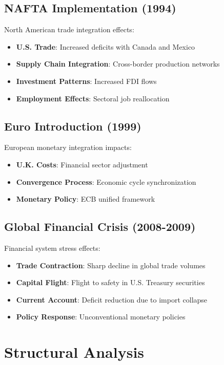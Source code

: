 \documentclass[11pt,a4paper]{article}
\begin{document}
\subsection{NAFTA Implementation (1994)}
North American trade integration effects:

\begin{itemize}
    \item \textbf{U.S. Trade}: Increased deficits with Canada and Mexico
    \item \textbf{Supply Chain Integration}: Cross-border production networks
    \item \textbf{Investment Patterns}: Increased FDI flows
    \item \textbf{Employment Effects}: Sectoral job reallocation
\end{itemize}

\subsection{Euro Introduction (1999)}
European monetary integration impacts:

\begin{itemize}
    \textbf{German Benefits}: Export competitiveness gains
    \item \textbf{U.K. Costs}: Financial sector adjustment
    \item \textbf{Convergence Process}: Economic cycle synchronization
    \item \textbf{Monetary Policy}: ECB unified framework
\end{itemize}

\subsection{Global Financial Crisis (2008-2009)}
Financial system stress effects:

\begin{itemize}
    \item \textbf{Trade Contraction}: Sharp decline in global trade volumes
    \item \textbf{Capital Flight}: Flight to safety in U.S. Treasury securities
    \item \textbf{Current Account}: Deficit reduction due to import collapse
    \item \textbf{Policy Response}: Unconventional monetary policies
\end{itemize}

\section{Structural Analysis}
\end{document}
